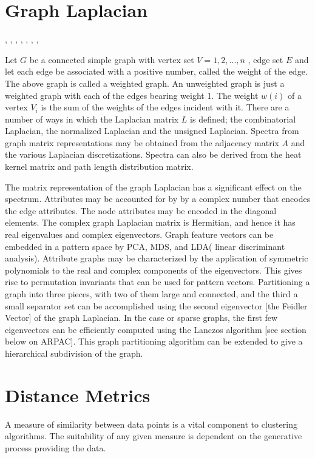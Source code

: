 \section{Graph Laplacian}
\cite{GLPBoydconvexoptimization}, \cite{GLPChung93laplaciansof}, \cite{GLPCrescenzi96toweight},
\cite{GLPGuatterygraphembeddings}, \cite{GLPBoydconvexoptimization},
\cite{GLPChung93laplaciansof},
\cite{GLPSpectralAnalysisComplexLaplacianMatrices}, \cite{GLPKellersignedgraph}

Let $G$ be a connected simple graph with vertex set $V = {1, 2, ... , n}$ , edge set $E$ and let each edge be associated with a positive number, called the weight of the edge. The above graph is called a weighted graph. An unweighted graph is just a weighted graph with each of the edges bearing weight 1.  The weight $w(i)$ of a vertex $V_i$ is the sum of the weights of the edges incident with it. There are a number of ways in which the  Laplacian matrix $L$ is defined; the combinatorial Laplacian, the normalized Laplacian and the unsigned Laplacian.  Spectra from graph matrix representations may be obtained from the adjacency matrix $A$ and the various Laplacian discretizations.  Spectra can also be derived from the heat kernel matrix and path length distribution matrix.

The matrix representation of the graph Laplacian has a significant effect on the spectrum.  Attributes may be accounted for by by a complex number that encodes the edge attributes.  The node attributes may be encoded in the diagonal elements.   The complex graph Laplacian matrix is Hermitian, and hence it has real eigenvalues and complex eigenvectors.  Graph feature vectors can be embedded in a pattern space by PCA, MDS, and LDA( linear discriminant analysis).  Attribute graphs may be characterized by the application of symmetric polynomials to the real and complex components of the eigenvectors. \cite{GLPAnaFred} This gives rise to permutation invariants that can be used for pattern vectors.  Partitioning a graph into three pieces, with two of them large and connected, and the third a small separator set can be accomplished using the second eigenvector [the Feidler Vector] of the graph Laplacian.  In the case or sparse graphs, the first few eigenvectors can be efficiently computed using the Lanczos algorithm [see section below on ARPAC].  This graph partitioning algorithm can be extended to give a hierarchical subdivision of the graph.


\section{Distance Metrics}
A measure of similarity between data points is a vital component to clustering algorithms.  The suitability of any given measure is dependent on the generative process providing the data.


